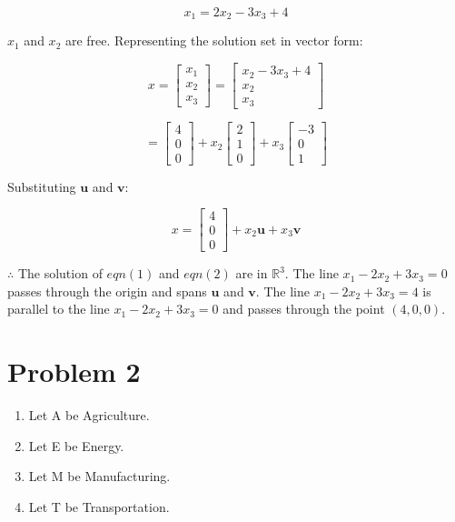 \documentclass[12pt, a4paper]{article}
\begin{document}
\[
    x_1 = 2x_2 - 3x_3 + 4
\]

$x_1$ and $x_2$ are free. Representing the solution set in vector form:

\[
    x = \begin{bmatrix}
        x_1 \\
        x_2 \\
        x_3
    \end{bmatrix} = \begin{bmatrix}
        x_2 - 3x_3 + 4\\
        x_2 \\
        x_3
    \end{bmatrix}
\]

\[
    = \begin{bmatrix}
        4 \\
        0 \\
        0
    \end{bmatrix} + x_2 \begin{bmatrix}
        2 \\
        1 \\
        0
    \end{bmatrix} + x_3 \begin{bmatrix}
        -3 \\
        0 \\
        1
    \end{bmatrix}
\]

Substituting $\boldsymbol{u}$ and $\boldsymbol{v}$:

\[
  x  = \begin{bmatrix}
        4 \\
        0 \\
        0
    \end{bmatrix} + x_2 \boldsymbol{u} + x_3 \boldsymbol{v}
\]

$\therefore$ The solution of $eqn(1)$ and $eqn(2)$ are in $\mathbb{R}^3$. The line $x_1-2x_2+3x_3 = 0$ passes through the origin and spans $\boldsymbol{u}$ and $\boldsymbol{v}$. The line $x_1-2x_2+3x_3 = 4$ is parallel to the line $x_1-2x_2+3x_3 = 0$ and passes through the point $(4, 0, 0)$.

\newpage

\section*{Problem 2}


\begin{enumerate}
    \item Let A be Agriculture.
    \item Let E be Energy.
    \item Let M be Manufacturing.
    \item Let T be Transportation.
\end{enumerate}
\end{document}
